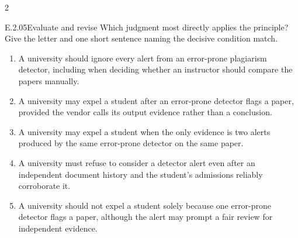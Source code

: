 \documentclass[9pt]{extarticle}
\newcommand{\choice}[1]{\item #1}
\begin{document}
\begin{multicols}{2}
\begin{DenseCoreProblem}{E.2.05}{Evaluate and revise}
Which judgment most directly applies the principle? Give the letter and one short sentence naming the decisive condition match.
\begin{enumerate}[label=(\alph*)]
  \choice{A university should ignore every alert from an error-prone plagiarism detector, including when deciding whether an instructor should compare the papers manually.}
  \choice{A university may expel a student after an error-prone detector flags a paper, provided the vendor calls its output evidence rather than a conclusion.}
  \choice{A university may expel a student when the only evidence is two alerts produced by the same error-prone detector on the same paper.}
  \choice{A university must refuse to consider a detector alert even after an independent document history and the student's admissions reliably corroborate it.}
  \choice{A university should not expel a student solely because one error-prone detector flags a paper, although the alert may prompt a fair review for independent evidence.}
\end{enumerate}
\end{DenseCoreProblem}
\end{multicols}
\CoreWorkArea
\FormBreak
{}
\end{document}
